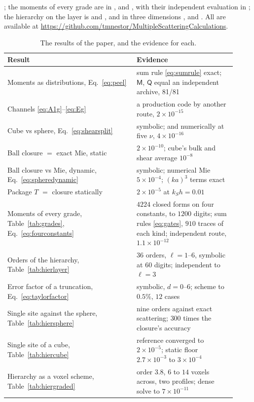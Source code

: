 \documentclass[11pt,a4paper]{article}
\begin{document}
; the moments of every grade are in
,  and
, with their independent evaluation in
; the hierarchy on the layer is
 and ,
and in three dimensions ,
 and
. All are available at
\url{https://github.com/tmnestor/MultipleScatteringCalculations}.

\begin{table}[htbp]
\centering
\caption{The results of the paper, and the evidence for each.}\label{tab:evidence}
\begin{tabular}{@{}>{\raggedright\arraybackslash}p{0.52\linewidth}>{\raggedright\arraybackslash}p{0.40\linewidth}@{}}
\toprule
Result & Evidence \\
\midrule
Moments as distributions, Eq.~\eqref{eq:peel} & sum rule \eqref{eq:sumrule} exact; $\mathsf M$, $\mathsf Q$ equal an independent archive, 81/81 \\
Channels \eqref{eq:A1g}--\eqref{eq:Eg} & a production code by another route, $2\times10^{-15}$ \\
Cube vs sphere, Eq.~\eqref{eq:shearsplit} & symbolic; and numerically at five $\nu$, $4\times10^{-16}$ \\
Ball closure $=$ exact Mie, static & $2\times10^{-10}$; cube's bulk and shear average $10^{-8}$ \\
Ball closure vs Mie, dynamic, Eq.~\eqref{eq:spheredynamic} & symbolic; numerical Mie $5\times10^{-4}$;
$(ka)^3$ terms exact \\
Package $T$ $=$ closure statically & $2\times10^{-5}$ at $k_Sh=0.01$ \\
Moments of every grade, Table~\ref{tab:grades}, Eq.~\eqref{eq:fourconstants} & $4224$ closed forms on four constants, to $1200$ digits; sum rules \eqref{eq:gates}, $910$ traces of each kind; independent route, $1.1\times10^{-12}$ \\
Orders of the hierarchy, Table~\ref{tab:hierlayer} & $36$ orders, $\ell=1$--$6$, symbolic at $60$ digits; independent to $\ell=3$ \\
Error factor of a truncation, Eq.~\eqref{eq:taylorfactor} & symbolic, $d=0$--$6$; scheme to $0.5\%$, $12$ cases \\
Single site against the sphere, Table~\ref{tab:hiersphere} & nine orders against exact scattering; $300$ times the closure's accuracy \\
Single site of a cube, Table~\ref{tab:hiercube} & reference converged to $2\times10^{-5}$; static floor $2.7\times10^{-3}$ to $3\times10^{-4}$ \\
Hierarchy as a voxel scheme, Table~\ref{tab:hiergraded} & order $3.8$, $6$ to $14$ voxels across, two profiles; dense solve to $7\times10^{-11}$ \\
\bottomrule
\end{tabular}
\end{table}
\end{document}
